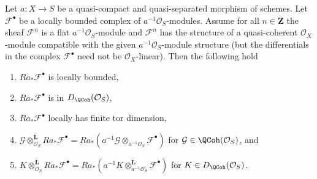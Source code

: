 %
\begin{lemma}
\label{lemma-cohomology-de-rham-base-change}
Let $a : X \to S$ be a quasi-compact and quasi-separated morphism
of schemes. Let $\mathcal{F}^\bullet$ be a locally bounded
complex of $a^{-1}\mathcal{O}_S$-modules. Assume for all $n \in \mathbf{Z}$
the sheaf $\mathcal{F}^n$ is a flat $a^{-1}\mathcal{O}_S$-module and
$\mathcal{F}^n$ has the structure of a quasi-coherent $\mathcal{O}_X$-module
compatible with the given $a^{-1}\mathcal{O}_S$-module structure (but the
differentials in the complex $\mathcal{F}^\bullet$ need not
be $\mathcal{O}_X$-linear). Then the following hold
\begin{enumerate}
\item $Ra_*\mathcal{F}^\bullet$ is locally bounded,
\item $Ra_*\mathcal{F}^\bullet$ is in $D_\QCoh(\mathcal{O}_S)$,
\item $Ra_*\mathcal{F}^\bullet$ locally has finite tor dimension,
\item $\mathcal{G} \otimes_{\mathcal{O}_S}^\mathbf{L} Ra_*\mathcal{F}^\bullet =
Ra_*(a^{-1}\mathcal{G} \otimes_{a^{-1}\mathcal{O}_S} \mathcal{F}^\bullet)$
for $\mathcal{G} \in \QCoh(\mathcal{O}_S)$, and
\item $K \otimes_{\mathcal{O}_S}^\mathbf{L} Ra_*\mathcal{F}^\bullet =
Ra_*(a^{-1}K \otimes_{a^{-1}\mathcal{O}_S}^\mathbf{L} \mathcal{F}^\bullet)$
for $K \in D_\QCoh(\mathcal{O}_S)$.
\end{enumerate}
\end{lemma}

